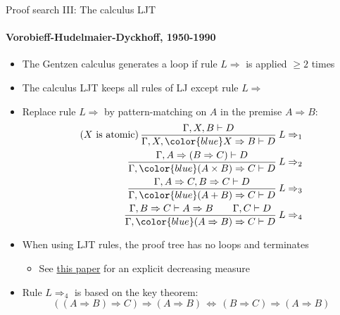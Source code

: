 \documentclass[english]{beamer}
\begin{document}
\begin{frame}{Proof search III: The calculus LJT}


\framesubtitle{Vorobieff-Hudelmaier-Dyckhoff, 1950-1990}
\begin{itemize}
\item The Gentzen calculus generates a loop if rule $L\Rightarrow$ is applied
$\geq2$ times
\item The calculus LJT keeps all rules of LJ except rule $L\Rightarrow$
\item Replace rule $L\Rightarrow$ by pattern-matching on $A$ in the premise
$A\Rightarrow B$:
\begin{align*}
\text{(}X\text{ is atomic)\,}\frac{\Gamma,X,B\vdash D}{\Gamma,X,{\color{blue}X\Rightarrow B}\vdash D}\:L\Rightarrow_{1}\\
\frac{\Gamma,A\Rightarrow(B\Rightarrow C)\vdash D}{\Gamma,{\color{blue}(A\times B)\Rightarrow C}\vdash D}\:L\Rightarrow_{2}\\
\frac{\Gamma,A\Rightarrow C,B\Rightarrow C\vdash D}{\Gamma,{\color{blue}(A+B)\Rightarrow C}\vdash D}\:L\Rightarrow_{3}\\
\frac{\Gamma,B\Rightarrow C\vdash A\Rightarrow B\quad\quad\Gamma,C\vdash D}{\Gamma,{\color{blue}(A\Rightarrow B)\Rightarrow C}\vdash D}\:L\Rightarrow_{4}
\end{align*}
\item When using LJT rules, the proof tree has no loops and terminates
\begin{itemize}
\item See \href{http://citeseer.ist.psu.edu/viewdoc/summary?doi=10.1.1.35.2618}{this paper}
for an explicit decreasing measure{\footnotesize{} }{\footnotesize \par}
\end{itemize}
\item Rule $L\Rightarrow_{4}$ is based on the key theorem: {\footnotesize{}
\[
\left(\left(A\Rightarrow B\right)\Rightarrow C\right)\Rightarrow\left(A\Rightarrow B\right)\,\Longleftrightarrow\,\left(B\Rightarrow C\right)\Rightarrow\left(A\Rightarrow B\right)
\]
}{\footnotesize \par}
\end{itemize}
\end{frame}
\end{document}
